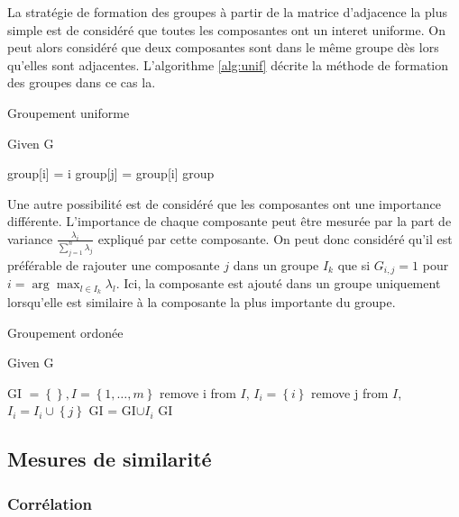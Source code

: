 \documentclass{gretsi}
\newcommand{\set}[1]{\left \{ 1, \dots, #1 \right \}}
\begin{document}
La stratégie de formation des groupes à partir de la matrice d'adjacence la plus simple est de considéré que toutes les composantes ont un interet uniforme. On peut alors considéré que deux composantes sont dans le même groupe dès lors qu'elles sont adjacentes. L'algorithme \ref{alg:unif} décrite la méthode de formation des groupes dans ce cas la.\\

\begin{algorithm}
\caption{Groupement uniforme}\label{alg:unif}
Given G
\begin{algorithmic}[1]
\State group[i] = i
\EndFor
{}
 group[j] = group[i]
\EndIf
\EndFor
\EndFor
\State \Return group
\end{algorithmic}
\end{algorithm}

Une autre possibilité est de considéré que les composantes ont une importance différente. L'importance de chaque composante peut être mesurée par la part de variance $\frac{\lambda_i}{\sum_{j=1}^n \lambda_j}$ expliqué par cette composante. On peut donc considéré qu'il est préférable de rajouter une composante $j$ dans un groupe $I_k$ que si $G_{i, j} = 1$ pour $i = \arg\max_{l \in I_k} \lambda_l$. Ici, la composante est ajouté dans un groupe uniquement lorsqu'elle est similaire à la composante la plus importante du groupe.

\begin{algorithm}
\caption{Groupement ordonée}\label{alg:ord}
Given G
\begin{algorithmic}[1]
\State GI $= \left \{  \right \}, I = \set{m}$
\State remove i from $I$, $I_i = \left \{ i \right \}$
\State remove j from $I$, $I_i = I_i \cup \left \{ j \right \}$
\EndIf
\EndFor
\State GI = GI$ \cup I_i$
\EndFor
\State \Return GI
\end{algorithmic}
\end{algorithm}



\subsection{Mesures de similarité}
\label{sub:sim}

\subsubsection{Corrélation}
\end{document}
